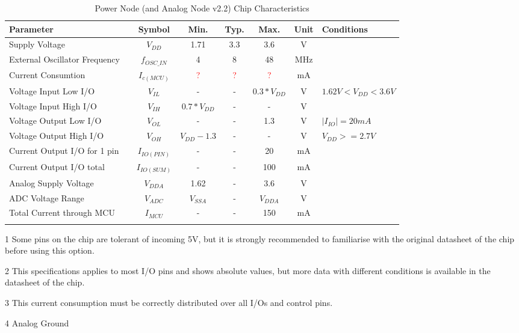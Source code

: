 \documentclass[10pt]{datasheet}
\begin{document}
\begin{table}[h]
\begin{threeparttable}
\caption{Power Node (and Analog Node v2.2) Chip\cite{ref8} Characteristics}
\label{table:power_node_char}
\begin{tabularx}{\textwidth}{l c | c| c c c | c | X}
    \thickhline
    \textbf{Parameter} & & \textbf{Symbol} & \textbf{Min.} & \textbf{Typ.} & \textbf{Max.} &
    \textbf{Unit} & \textbf{Conditions} \\
    \hline
    Supply Voltage & &$V_{DD}$ & 1.71 & 3.3 & 3.6 & V \\
    \hline
    External Oscillator Frequency & &$f_{OSC\_IN}$ & 4 & 8 & 48 & MHz \\
    \hline
    Current Consumtion & &$I_{c(MCU)}$ & \textcolor{red}? & \textcolor{red}? & \textcolor{red}? & mA \\
    \hline
    Voltage Input Low I/O & &$V_{IL}$ & - & - & $0.3*V_{DD}$ & V & \multirow{2}{*}{$1.62 V<V_{DD}<3.6 V$}\\
    \cline{1-7}
    Voltage Input High I/O\tnote{1} & &$V_{IH}$ & $0.7*V_{DD}$ & - & - & V & \\
    \hline
    Voltage Output Low I/O\tnote{2} & &$V_{OL}$ & - & - & 1.3 & V & $|I_{IO}| = 20 mA$ \\
    \cline{1-7}
    Voltage Output High I/O\tnote{2} & &$V_{OH}$ & $V_{DD}-1.3$ & - & - & V & $V_{DD} >= 2.7 V$\\
    \hline
    Current Output I/O for 1 pin & &$I_{IO(PIN)}$ & - & - & 20 & mA & \\
    \hline
    Current Output I/O total\tnote{3} & &$I_{IO(SUM)}$ & - & - & 100 & mA & \\
    \hline
    Analog Supply Voltage & &$V_{DDA}$ & 1.62 & - & 3.6 & V & \\
    \hline    
    ADC Voltage Range & &$V_{ADC}$ & $V_{SSA}$\tnote{4} & - & $V_{DDA}$ & V & \\
    \hline
    Total Current through MCU & &$I_{MCU}$ & - & - & 150 & mA & \\
    \hline
    \thickhline
\end{tabularx}
\begin{tablenotes}
\item[1] {Some pins on the chip are tolerant of incoming 5V, but it is strongly recommended to familiarise with the original datasheet of the chip before using this option.}
\item[2] {This specifications applies to most I/O pins and shows absolute values, but more data with different conditions is available in the datasheet of the chip.}
\item[3] {This current consumption must be correctly distributed over all I/Os and control pins.}
\item[4] {Analog Ground}
\end{tablenotes}
\end{threeparttable}
\end{table}
\newpage
\end{document}

